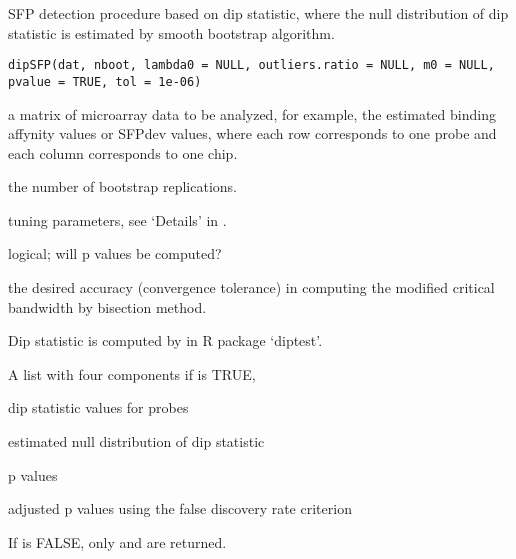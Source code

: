 \begin{Description}\relax
SFP detection procedure based on dip statistic, where the null
distribution of dip statistic is estimated by smooth bootstrap algorithm.
\end{Description}
\begin{Usage}
\begin{verbatim}
dipSFP(dat, nboot, lambda0 = NULL, outliers.ratio = NULL, m0 = NULL,
pvalue = TRUE, tol = 1e-06)
\end{verbatim}
\end{Usage}
\begin{Arguments}
\begin{ldescription}
\item[\code{dat}] a matrix of microarray data to be analyzed, for example,
the estimated binding affynity values or SFPdev values, where each row
corresponds to one probe and each column corresponds to one chip.

\item[\code{nboot}] the number of bootstrap replications.

\item[\code{lambda0,outliers.ratio,m0}] tuning parameters, see `Details' in .
\item[\code{pvalue}] logical; will p values be computed? 

\item[\code{tol}] the desired accuracy (convergence tolerance) in computing the
modified critical bandwidth by bisection method.

\end{ldescription}
\end{Arguments}
\begin{Details}\relax
Dip statistic is computed by  in R package `diptest'.
\end{Details}
\begin{Value}
A list with four components if  is TRUE,

\begin{ldescription}
\item[\code{dip.statistics}] dip statistic values for probes
\item[\code{null.distribution}] estimated null distribution of dip statistic
\item[\code{p.values}] p values
\item[\code{adjusted.pvalues}] adjusted p values using the false discovery
rate criterion
\end{ldescription}


If  is FALSE, only  and
 are returned.
\end{Value}
